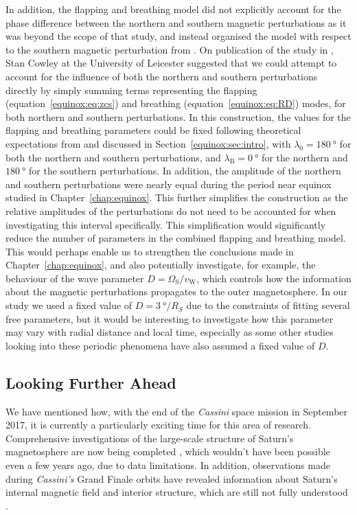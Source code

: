 In addition, the flapping and breathing  model did not explicitly account for the phase difference between the northern and southern magnetic perturbations as it was beyond the scope of that study, and instead organised the model with  respect to the southern magnetic perturbation from \citet{andrews2012}. On publication of the study in \citet{sorba2018}, Stan Cowley at the University of Leicester suggested that we could attempt to account for the influence of both the northern and southern perturbations directly by simply summing terms representing the flapping (equation~\ref{equinox:eq:zcs}) and breathing (equation~\ref{equinox:eq:RD}) modes, for both northern and southern perturbations. In this construction, the values for the flapping and breathing parameters could be fixed following theoretical expectations from \citet[e.g.][]{cowley2017a} and discussed in Section~\ref{equinox:sec:intro}, with $\lambda_0 = \SI{180}{\degree}$ for both the northern and southern perturbations, and $\lambda_\mathrm{B}=\SI{0}{\degree}$ for the northern and $\SI{180}{\degree}$ for the southern perturbations. In addition, the amplitude of the northern and southern perturbations were nearly equal during the period near equinox studied in  Chapter~\ref{chap:equinox}. This further simplifies the construction as the relative amplitudes of the perturbations do not need  to be accounted for when investigating this interval specifically. This simplification would significantly reduce the number of parameters  in the combined flapping and breathing model. This would perhaps enable  us to strengthen the conclusions made in Chapter~\ref{chap:equinox}, and also potentially investigate, for example, the behaviour of the wave parameter $D=\Omega_\mathrm{S}/v_\mathrm{W}$, which controls how the information about  the magnetic perturbations propagates to the outer magnetosphere. In our study we used a fixed value of $D=\SI{3}{\degree \per R_S}$ due to the constraints of fitting several free parameters, but it would be interesting to investigate how this parameter may vary with radial distance and local time, especially as some other studies looking into these periodic phenomena have also assumed a fixed value of $D$.

\subsection{Looking Further Ahead}
We have mentioned how, with the end of the \textit{Cassini} space mission in September 2017, it is currently a particularly exciting time for this area of research. Comprehensive investigations of the large-scale structure of Saturn's magnetosphere are now being completed \citep[e.g.][]{sergis2017,wilson2017}, which wouldn't have been possible even a few years ago, due to data limitations. In addition,  observations made during \textit{Cassini's} Grand Finale orbits have revealed information about Saturn's internal magnetic field and interior structure, which are still not fully understood \citep[e.g.][]{dougherty2018}. 

